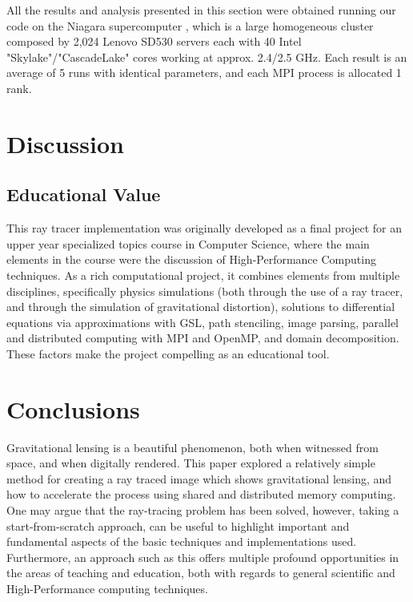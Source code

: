 All the results and analysis presented in this section were obtained
running our code on the Niagara supercomputer \cite{10.1145/3332186.3332195},
which is a large homogeneous cluster composed by 2,024 Lenovo SD530 servers
each with 40 Intel "Skylake"/"CascadeLake" cores working at approx. 2.4/2.5 GHz.
Each result is an average of 5 runs with identical parameters, and each MPI process is allocated 1 rank.



\section{Discussion}
\label{sec:disc}

\subsection{Educational Value}

This ray tracer implementation was originally developed as a final project for
an upper year specialized topics course in Computer Science, where the main
elements in the course were the discussion of High-Performance Computing
techniques.
As a rich computational project, it combines elements from multiple disciplines, specifically
physics simulations (both through the use of a ray tracer, and through the simulation of gravitational distortion),
solutions to differential equations via approximations with GSL,
path stenciling, image parsing,
parallel and distributed computing with MPI and OpenMP, and domain decomposition.
These factors make the project compelling as an educational tool.


\section{Conclusions}
\label{sec:concl}

Gravitational lensing is a beautiful phenomenon, both when witnessed from space, and when digitally rendered.
This paper explored a relatively simple method for creating a ray traced image which shows gravitational lensing, and how to accelerate the process using shared and distributed memory computing.
One may argue that the ray-tracing problem has been solved,
however, taking a start-from-scratch approach, can be useful to highlight important and fundamental aspects of the basic techniques and implementations used.
Furthermore, an approach such as this offers multiple profound opportunities in the areas of teaching and education, both with regards to general scientific and High-Performance computing techniques.

